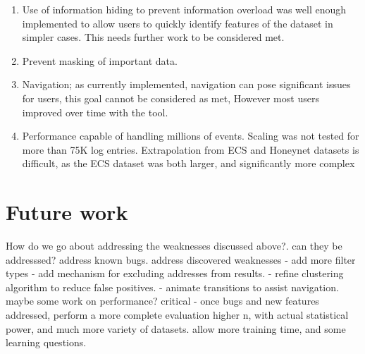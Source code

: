 \begin{enumerate}
\item{Use of information hiding to prevent information overload was well enough implemented to allow users to quickly identify features of the dataset in simpler cases. This needs further work to be considered met.}
\item{Prevent masking of important data.}
\item{Navigation; as currently implemented, navigation can pose significant issues for users, this goal cannot be considered as met, However most users improved over time with the tool.}
\item{Performance capable of handling millions of events. Scaling was not tested for more than 75K log entries. Extrapolation from ECS and Honeynet datasets is difficult, as the ECS dataset was both larger, and significantly more complex}
\end{enumerate}

\section{Future work}\label{eval_future}
How do we go about addressing the weaknesses discussed above?.
can they be addresssed?
address known bugs.
address discovered weaknesses
 - add more filter types
 - add mechanism for excluding addresses from results.
 - refine clustering algorithm to reduce false positives. 
 - animate transitions to assist navigation.
maybe some work on performance?
critical - once bugs and new features addressed, perform a more complete evaluation
higher n, with actual statistical power, and much more variety of datasets. allow more training time, and some learning questions.